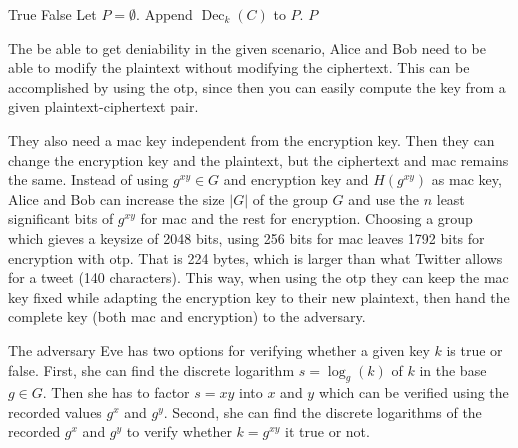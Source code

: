 \documentclass[draft]{llncs}
\DeclareMathOperator{\dec}{\mathrm{Dec}}
\DeclareMathOperator{\mac}{\mathrm{MAC}}
\newcommand{\ord}[1]{|#1|}
\DeclareMathOperator{\K}{\mathcal K}
\begin{document}
\begin{algorithm}
  \caption{%
    Algorithm for finding possible plaintexts and discarding false keys.
  }
  \label{alg:falsekeys}
  \begin{algorithmic}
      \If{$\mac_{H(k)}( C ) = M$}
        \State \Return True
      \EndIf
      \State \Return False
    \EndFunction
    \Statex
      \State Let $P = \emptyset$.
      \ForAll{$k\in \K$}\Comment{Keyspace $\K$}
          \State Append $\dec_k( C )$ to $P$.
        \EndIf
      \EndFor
      \State \Return $P$
    \EndFunction
  \end{algorithmic}
\end{algorithm}

The be able to get deniability in the given scenario, Alice and Bob need to be 
able to modify the plaintext without modifying the ciphertext.
This can be accomplished by using the \ac{otp}, since then you can easily 
compute the key from a given plaintext-ciphertext pair.

They also need a \ac{mac} key independent from the encryption key.
Then they can change the encryption key and the plaintext, but the ciphertext 
and \ac{mac} remains the same.
Instead of using \(g^{xy}\in G\) and encryption key and \(H(g^{xy})\) as 
\ac{mac} key, Alice and Bob can increase the size \(\ord G\) of the group \(G\) 
and use the \(n\) least significant bits of \(g^{xy}\) for \ac{mac} and the 
rest for encryption.
Choosing a group which gieves a keysize of 2048 bits, using 256 bits for 
\ac{mac} leaves 1792 bits for encryption with \ac{otp}.
That is 224 bytes, which is larger than what Twitter allows for a tweet (140 
characters).
This way, when using the \ac{otp} they can keep the \ac{mac} key fixed while 
adapting the encryption key to their new plaintext, then hand the complete key 
(both \ac{mac} and encryption) to the adversary.

The adversary Eve has two options for verifying whether a given key \(k\) is 
true or false.
First, she can find the discrete logarithm \(s = \log_g( k )\) of \(k\) in the 
base \(g\in G\).
Then she has to factor \(s = xy\) into \(x\) and \(y\) which can be verified 
using the recorded values \(g^x\) and \(g^y\).
Second, she can find the discrete logarithms of the recorded \(g^x\) and 
\(g^y\) to verify whether \(k = g^{xy}\) it true or not.
\end{document}
